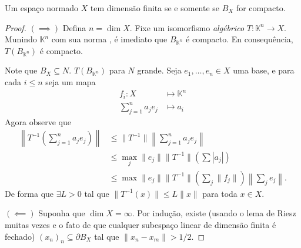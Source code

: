 \documentclass[portuguese]{article}
\theoremstyle{definition}
\begin{document}
	\begin{teo}
		Um espaço normado $X$ tem dimensão finita se e somente se $B_X$ for compacto.
	\end{teo}
	\begin{proof}
		\textbf{$(\implies)$} Defina $n=\dim X$. Fixe um isomorfismo \textit{algébrico} $T:\mathbb{K}^n\to X$. Munindo $\mathbb{K}^n$ com sua norma , é imediato que $B_{\mathbb{K}^n}$ é compacto. En consequência, $T(B_{\mathbb{K}^n})$ é compacto.
		
		Note que $B_X\subseteq N$. $T(B_{\mathbb{K}^n})$ para $N$ grande. Seja $e_1,\ldots, e_n\in X$ uma base, e para cada $i\leq n$ seja um mapa
		\begin{align*}
			f_i:X&\mapsto\mathbb{K}^n\\
			\sum_{j=1}^na_je_j&\mapsto a_i
		\end{align*}
		Agora observe que
		\begin{align*}
			\left\| T^{-1}\left(\sum_{j=1}^na_je_j\right)\right\|&\leq\| T^{-1}\|\left\|\sum_{j=1}^na_je_j\right\|\\
			&\leq \max_j\| e_j\|\| T^{-1}\|\left(\sum|a_j|\right)\\
			&\leq\max\| e_j\|\| T^{-1}\|\left(\sum_j\| f_j\|\right)\left\|\sum_je_j\right\|.
		\end{align*}
		De forma que $\exists L>0$ tal que $\| T^{-1}(x)\|\leq L\| x\|$ para toda $x\in X$.
		
		\textbf{$(\impliedby)$} Suponha que $\dim X=\infty$. Por indução, existe (usando o lema de Riesz muitas vezes e o fato de que cualquer subespaço linear de dimensão finita é fechado) $(x_n)_n\subseteq\partial B_X$ tal que $\| x_n-x_m\|>1/2$.
	\end{proof}
	
\end{document}
